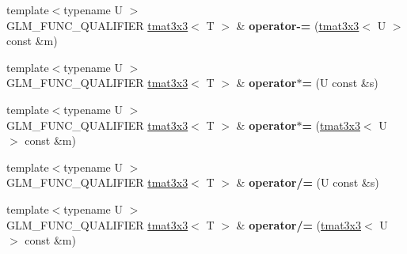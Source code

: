 \begin{DoxyCompactItemize}
\item 
\hypertarget{structglm_1_1detail_1_1tmat3x3_a19536db51bd84f4219209a0b6ef92182}{{\footnotesize template$<$typename U $>$ }\\G\-L\-M\-\_\-\-F\-U\-N\-C\-\_\-\-Q\-U\-A\-L\-I\-F\-I\-E\-R \hyperlink{structglm_1_1detail_1_1tmat3x3}{tmat3x3}$<$ T $>$ \& {\bfseries operator-\/=} (\hyperlink{structglm_1_1detail_1_1tmat3x3}{tmat3x3}$<$ U $>$ const \&m)}\label{structglm_1_1detail_1_1tmat3x3_a19536db51bd84f4219209a0b6ef92182}

\item 
\hypertarget{structglm_1_1detail_1_1tmat3x3_a6990048c6ddf16f2bd84bca0b89bb808}{{\footnotesize template$<$typename U $>$ }\\G\-L\-M\-\_\-\-F\-U\-N\-C\-\_\-\-Q\-U\-A\-L\-I\-F\-I\-E\-R \hyperlink{structglm_1_1detail_1_1tmat3x3}{tmat3x3}$<$ T $>$ \& {\bfseries operator$\ast$=} (U const \&s)}\label{structglm_1_1detail_1_1tmat3x3_a6990048c6ddf16f2bd84bca0b89bb808}

\item 
\hypertarget{structglm_1_1detail_1_1tmat3x3_a5bc7b8929e609b3f2172de98a3171695}{{\footnotesize template$<$typename U $>$ }\\G\-L\-M\-\_\-\-F\-U\-N\-C\-\_\-\-Q\-U\-A\-L\-I\-F\-I\-E\-R \hyperlink{structglm_1_1detail_1_1tmat3x3}{tmat3x3}$<$ T $>$ \& {\bfseries operator$\ast$=} (\hyperlink{structglm_1_1detail_1_1tmat3x3}{tmat3x3}$<$ U $>$ const \&m)}\label{structglm_1_1detail_1_1tmat3x3_a5bc7b8929e609b3f2172de98a3171695}

\item 
\hypertarget{structglm_1_1detail_1_1tmat3x3_aefc88ba39684548fcdad9f02f9144b65}{{\footnotesize template$<$typename U $>$ }\\G\-L\-M\-\_\-\-F\-U\-N\-C\-\_\-\-Q\-U\-A\-L\-I\-F\-I\-E\-R \hyperlink{structglm_1_1detail_1_1tmat3x3}{tmat3x3}$<$ T $>$ \& {\bfseries operator/=} (U const \&s)}\label{structglm_1_1detail_1_1tmat3x3_aefc88ba39684548fcdad9f02f9144b65}

\item 
\hypertarget{structglm_1_1detail_1_1tmat3x3_af62460353adb37ff2118b39cac0eb9d0}{{\footnotesize template$<$typename U $>$ }\\G\-L\-M\-\_\-\-F\-U\-N\-C\-\_\-\-Q\-U\-A\-L\-I\-F\-I\-E\-R \hyperlink{structglm_1_1detail_1_1tmat3x3}{tmat3x3}$<$ T $>$ \& {\bfseries operator/=} (\hyperlink{structglm_1_1detail_1_1tmat3x3}{tmat3x3}$<$ U $>$ const \&m)}\label{structglm_1_1detail_1_1tmat3x3_af62460353adb37ff2118b39cac0eb9d0}

\end{DoxyCompactItemize}
